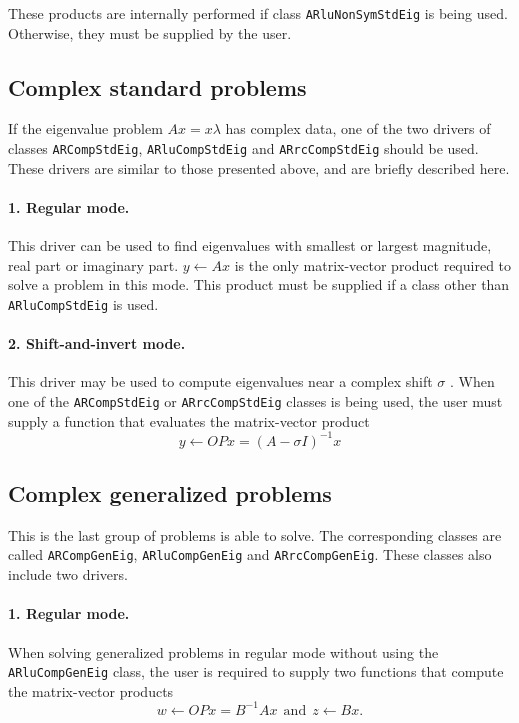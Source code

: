These products are internally performed if class \texttt{ARluNonSymStdEig} is being used. Otherwise, they must be supplied by the user.

\subsection{Complex standard problems}
If the eigenvalue problem $Ax=x\lambda$ has complex data, one of the two drivers of classes \texttt{ARCompStdEig}, \texttt{ARluCompStdEig} and \texttt{ARrcCompStdEig} should be used. These drivers are similar to those presented above, and are briefly described here.

\paragraph{1. Regular mode.}
This driver can be used to find eigenvalues with smallest or largest magnitude, real part or imaginary part. $y \leftarrow Ax$ is the only matrix-vector product required to solve a problem in this mode. This product must be supplied if a class other than \texttt{ARluCompStdEig} is used.

\paragraph{2. Shift-and-invert mode.}
This driver may be used to compute eigenvalues near a complex shift $\sigma$ . When one of the \texttt{ARCompStdEig} or \texttt{ARrcCompStdEig} classes is being used, the user must supply a function that evaluates the matrix-vector product 
\[y\leftarrow OPx=(A-\sigma I)^{-1} x\]

\subsection{Complex generalized problems}
This is the last group of problems \ARPP{} is able to solve. The corresponding classes are called \texttt{ARCompGenEig}, \texttt{ARluCompGenEig} and \texttt{ARrcCompGenEig}. These classes also include two drivers. 

\paragraph{1. Regular mode.}
When solving generalized problems in regular mode without using the \texttt{ARluCompGenEig} class, the user is required to supply two functions that compute the matrix-vector products
\[w\leftarrow OPx=B^{-1} Ax \ \ \text{and} \ \ z\leftarrow Bx.\] 

